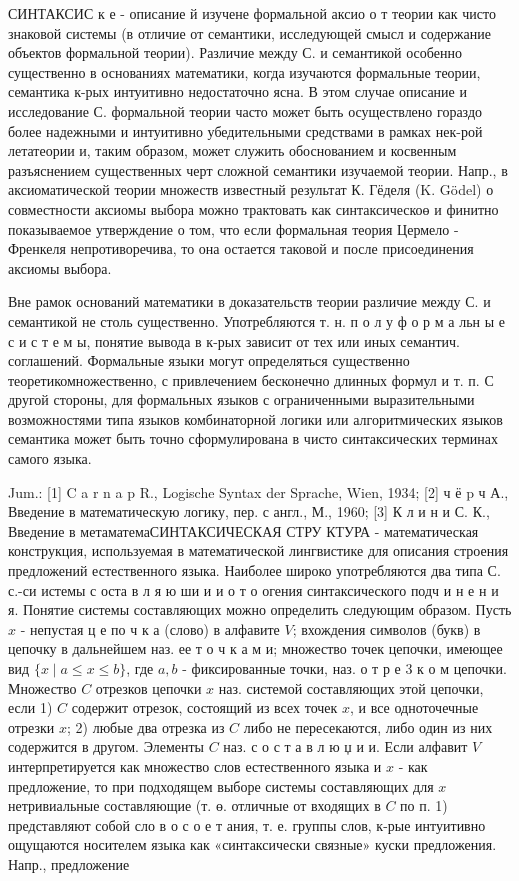 \documentclass[10pt]{article}
\begin{document}
СИНТАКСИС к е - описание й изучене формальной аксио о т теории как чисто знаковой системы (в отличие от семантики, исследующей смысл и содержание объектов формальной теории). Различие между С. и семантикой особенно существенно в основаниях математики, когда изучаются формальные теории, семантика к-рых интуитивно недостаточно ясна. В этом случае описание и исследование С. формальной теории часто может быть осуществлено гораздо более надежными и интуитивно убедительными средствами в рамках нек-рой летатеории и, таким образом, может служить обоснованием и косвенным разъяснением существенных черт сложной семантики изучаемой теории. Напр., в аксиоматической теории множеств известный результат К. Гёделя (K. Gödel) о совместности аксиомы выбора можно трактовать как синтаксическоө и финитно показываемое утверждение о том, что если формальная теория Цермело - Френкеля непротиворечива, то она остается таковой и после присоединения аксиомы выбора.



Вне рамок оснований математики в доказательств теории различие между С. и семантикой не столь существенно. Употребляются т. н. п о л у ф о р м а льн ы е с и с т е м ы, понятие вывода в к-рых зависит от тех или иных семантич. соглашений. Формальные языки могут определяться существенно теоретикомножественно, с привлечением бесконечно длинных формул и т. п. С другой стороны, для формальных языков с ограниченными выразительными возможностями типа языков комбинаторной логики или алгоритмических языков семантика может быть точно сформулирована в чисто синтаксических терминах самого языка.



Jum.: [1] C a r n a p R., Logische Syntax der Sprache, Wien, 1934; [2] ч ё p ч А., Введение в математическую логику, пер. с англ., М., 1960; [3] К л и н и С. К., Введение в метаматемаСИНТАКСИЧЕСКАЯ СТРУ КТУРА - математическая конструкция, используемая в математической лингвистике для описания строения предложений естественного языка. Наиболее широко употребляются два типа С. с.-си истемы с оста в л я ю ши и и о т о огения синтаксического подч и н е н и я. Понятие системы составляющих можно определить следующим образом. Пусть $x$ - непустая ц е по ч к а (слово) в алфавите $V$; вхождения символов (букв) в цепочку в дальнейшем наз. ее т о ч к а м и; множество точек цепочки, имеющее вид $\{x \mid a \leqslant x \leqslant b\}$, где $a, b$ - фиксированные точки, наз. о т р е 3 к о м цепочки. Множество $C$ отрезков цепочки $x$ наз. системой составляющих этой цепочки, если 1) $C$ содержит отрезок, состоящий из всех точек $x$, и все одноточечные отрезки $x$; 2) любые два отрезка из $C$ либо не пересекаются, либо один из них содержится в другом. Элементы $C$ наз. с о с т а в л ю џ и и. Если алфавит $V$ интерпретируется как множество слов естественного языка и $x$ - как предложение, то при подходящем выборе системы составляющих для $x$ нетривиальные составляющие (т. ө. отличные от входящих в $C$ по п. 1) представляют собой сло в о с о е т ания, т. е. группы слов, к-рые интуитивно ощущаются носителем языка как «синтаксически связные» куски предложения. Напр., предложение
\end{document}
